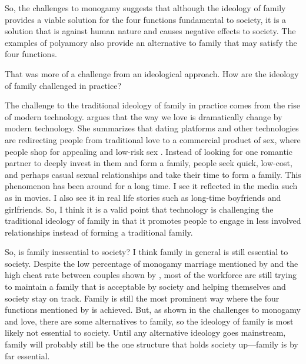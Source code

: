 \documentclass[12pt]{article}
\begin{document}
So, the challenges to monogamy suggests that although the ideology of family
provides a viable solution for the four functions fundamental to society,
it is a solution that is against human nature and
causes negative effects to society.
The examples of polyamory also provide an alternative to family that may
satisfy the four functions.

That was more of a challenge from an ideological approach.
How are the ideology of family challenged in practice?

The challenge to the traditional ideology of family in practice comes from
the rise of modern technology.
\citet{malinowska2022love} argues that the way we love is
dramatically change by modern technology.
She summarizes that dating platforms and other technologies are redirecting
people from traditional love to a commercial product of sex,
where people shop for appealing and low-risk sex \citep{malinowska2022love}.
Instead of looking for one romantic partner to deeply invest in them and form a
family, people seek quick, low-cost, and perhaps casual sexual relationships and
take their time to form a family.
This phenomenon has been around for a long time.
I see it reflected in the media such as in movies.
I also see it in real life stories such as long-time boyfriends and girlfriends.
So, I think it is a valid point that technology is challenging the traditional
ideology of family in that it promotes people to engage in less involved
relationships instead of forming a traditional family.

So, is family inessential to society?
I think family in general is still essential to society.
Despite the low percentage of monogamy marriage mentioned by
\citet[p. 63]{gittins1993family} and the high cheat rate between couples shown
by \citet{fridman2023aella},
most of the workforce are still trying to maintain a family that is acceptable
by society and helping themselves and society stay on track.
Family is still the most prominent way where the four functions mentioned by
\citet[p. 60]{gittins1993family} is achieved.
But, as shown in the challenges to monogamy and love,
there are some alternatives to family,
so the ideology of family is most likely not essential to society.
Until any alternative ideology goes mainstream,
family will probably still be the one structure that holds society up—family
is by far essential.
\pagebreak


\end{document}
